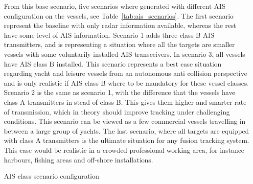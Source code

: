From this base scenario, five scenarios where generated with different AIS configuration on the vessels, see Table~\ref{tab:ais_scenarios}. The first scenario represent the baseline with only radar information available, whereas the rest have some level of AIS information. Scenario 1 adds three class B AIS transmitters, and is representing a situation where all the targets are smaller vessels with some voluntarily installed AIS transceivers. In scenario 3, all vessels have AIS class B installed. This scenario represents a best case situation regarding yacht and leisure vessels from an autonomous anti collision perspective and is only realistic if AIS class B where to be mandatory for these vessel classes. Scenario 2 is the same as scenario 1, with the difference that the vessels have class A transmitters in stead of class B. This gives them higher and smarter rate of transmission, which in theory should improve tracking under challenging conditions. This scenario can be viewed as a few commercial vessels travelling in between a large group of yachts. The last scenario, where all targets are equipped with class A transmitters is the ultimate situation for any fusion tracking system. This case would be realistic in a crowded professional working area, for instance harbours, fishing areas and off-shore installations.
\begin{table}
\centering
{}
\caption{AIS class scenario configuration}\label{tab:ais_scenarios}
\end{table}

